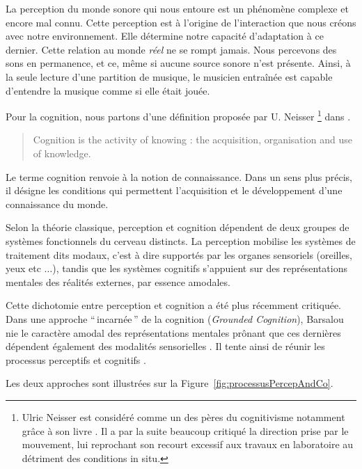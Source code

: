 La perception du monde sonore qui nous entoure est un phénomène complexe et encore mal connu. Cette perception est à l'origine de l'interaction que nous créons avec notre environnement. Elle détermine notre capacité d'adaptation à ce dernier. Cette relation au monde \emph{réel} ne se rompt jamais. Nous percevons des sons en permanence, et ce, même si aucune source sonore n'est présente. Ainsi, à la seule lecture d'une partition de musique, le musicien entraînée est capable d'entendre la musique comme si elle était jouée.

Pour la cognition, nous partons d'une définition proposée par U. Neisser \footnote{Ulric Neisser est considéré comme un des pères du cognitivisme notamment grâce à son livre \citep{neisser1967cognitive}. Il a par la suite beaucoup critiqué la direction prise par le mouvement, lui reprochant son recourt excessif aux travaux en laboratoire au détriment des conditions in situ.} dans \citep[p. ??]{neisser1976cognition} .

\begin{quote}
Cognition is the activity of knowing : the acquisition, organisation and use of knowledge.
\end{quote}

Le terme cognition renvoie à la notion de connaissance. Dans un sens plus précis, il désigne les conditions qui permettent l'acquisition et le développement d'une connaissance du monde.

Selon la théorie classique, perception et cognition dépendent de deux groupes de systèmes fonctionnels du cerveau distincts. La perception mobilise les systèmes de traitement dits modaux, c'est à dire supportés par les organes sensoriels (oreilles, yeux etc $\ldots$), tandis que les systèmes cognitifs s'appuient sur des représentations mentales des réalités externes, par essence amodales.

Cette dichotomie entre perception et cognition a été plus récemment critiquée. Dans une approche ``\,incarnée\,'' de la cognition (\emph{Grounded Cognition}), Barsalou nie le caractère amodal des représentations mentales prônant que ces dernières dépendent également des modalités sensorielles \citep{barsalou2010grounded}. Il tente ainsi de réunir les processus perceptifs et cognitifs \citep{goldstone1998reuniting, barsalou1999perceptions}. 

Les deux approches sont illustrées sur la Figure~\ref{fig:processusPercepAndCo}.

